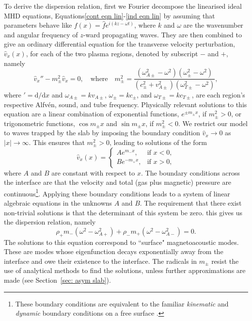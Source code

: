 \documentclass[12pt]{../style-files/ociamthesis}
\begin{document}
To derive the dispersion relation, first we Fourier decompose the linearised ideal MHD equations, Equations\eqref{cont eqn lin}-\eqref{ind eqn lin} by assuming that parameters behave like $f(x) = \hat{f}e^{i(kz - \omega t)}$, where $k$ and $\omega$ are the wavenumber and angular frequency of $z$-ward propagating waves. They are then combined to give an ordinary differential equation for the transverse velocity perturbation, $\hat{v}_x(x)$, for each of the two plasma regions, denoted by subscript $-$ and $+$, namely
\begin{equation}
\hat{v}_x'' - m_\pm^2\hat{v}_x = 0, \quad \text{where} \quad
m_\pm^2 = \frac{(\omega_{A\pm}^2 - \omega^2)(\omega_\pm^2 - \omega^2)}{(c_\pm^2 + v_{A\pm}^2)(\omega_{T\pm}^2 - \omega^2)},
\end{equation}
where $'=\textrm{d}/\textrm{d}x$ and $\omega_{A\pm} = kv_{A\pm}$, $\omega_{\pm} = kc_{\pm}$, and $\omega_{T\pm} = kc_{T\pm}$, are each region's respective Alfv\'{e}n, sound, and tube frequency. Physically relevant solutions to this equation are a linear combination of exponential functions, $e^{\pm m_\pm x}$, if $m_\pm^2 > 0$, or trigonometric functions, $\cos{m_\pm x}$ and $\sin{m_\pm x}$, if $m_\pm^2 < 0$. We restrict our model to waves trapped by the slab by imposing the boundary condition $\hat{v}_x \to 0$ as $|x| \to \infty$. This ensures that $m_\pm^2 > 0$, leading to solutions of the form
\begin{equation}
\hat{v}_x(x)=
\begin{cases}
Ae^{m_-x}, & \text{if } x < 0, \\
Be^{-m_+x}, & \text{if } x > 0,
\end{cases} \label{vsoln}
\end{equation}
where $A$ and $B$ are constant with respect to $x$. The boundary conditions across the interface are that the velocity and total (gas plus magnetic) pressure are continuous\footnote{These boundary conditions are equivalent to the familiar \textit{kinematic} and \textit{dynamic} boundary conditions on a free surface \cite{goe_etal04}.}. Applying these boundary conditions leads to a system of linear algebraic equations in the unknowns $A$ and $B$. The requirement that there exist non-trivial solutions is that the determinant of this system be zero. this gives us the dispersion relation, namely
\begin{equation}
	\rho_+m_-(\omega^2 - \omega_{A+}^2) + \rho_-m_+(\omega^2 - \omega_{A-}^2) = 0. \label{DR interface}
\end{equation}
The solutions to this equation correspond to ``surface" magnetoacoustic modes. These are modes whose eigenfunction decays exponentially away from the interface and owe their existence to the interface. The radicals in $m_\pm$ resist the use of analytical methods to find the solutions, unless further approximations are made (see Section~\ref{sec: asym slab}).
\end{document}

